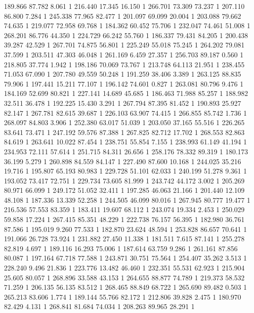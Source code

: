 	189.866	87.782	8.061	1
	216.440	17.345	16.150	1
	266.701	73.309	73.237	1
	207.110	86.800	7.284	1
	245.338	77.965	82.477	1
	201.097	69.099	20.004	1
	203.088	79.662	74.635	1
	219.077	72.958	69.768	1
	184.362	60.452	75.706	1
	232.047	74.461	51.008	1
	268.201	86.776	44.350	1
	224.729	66.242	55.760	1
	186.337	79.431	84.205	1
	200.438	39.287	42.529	1
	267.701	74.875	56.801	1
	225.249	55.018	75.245	1
	264.202	79.081	37.599	1
	203.511	47.303	46.048	1
	261.169	6.459	27.357	1
	256.703	89.187	0.560	1
	218.805	37.774	1.942	1
	198.186	70.069	73.767	1
	213.748	64.113	21.951	1
	238.455	71.053	67.090	1
	207.780	49.559	50.248	1
	191.259	38.406	3.389	1
	263.125	88.835	79.906	1
	197.441	15.211	77.107	1
	196.142	74.601	0.827	1
	263.081	80.796	9.476	1
	184.169	52.699	80.821	1
	227.141	14.689	45.685	1
	186.463	71.988	85.257	1
	188.982	32.511	36.478	1
	192.225	15.430	3.291	1
	267.794	87.395	81.452	1
	190.893	25.927	82.147	1
	267.781	82.615	39.687	1
	226.103	63.907	74.415	1
	266.855	85.742	1.736	1
	268.097	84.803	3.906	1
	252.380	63.017	51.039	1
	203.050	37.165	55.516	1
	226.265	83.641	73.471	1
	247.192	59.576	87.388	1
	267.825	82.712	17.702	1
	268.553	82.863	84.619	1
	263.641	10.022	87.454	1
	238.751	55.854	7.155	1
	238.993	61.149	41.194	1
	234.953	72.111	57.614	1
	251.715	84.311	26.656	1
	258.176	78.332	89.319	1
	180.173	36.199	5.279	1
	260.898	84.559	84.147	1
	227.490	87.600	10.168	1
	244.025	35.216	19.716	1
	195.807	65.193	80.983	1
	229.728	51.101	62.033	1
	240.199	51.278	9.361	1
	193.052	73.417	72.751	1
	229.734	73.605	81.999	1
	243.742	44.172	3.002	1
	205.269	80.971	66.099	1
	249.172	51.052	32.411	1
	197.285	46.063	21.166	1
	201.440	12.109	48.108	1
	187.336	13.339	52.258	1
	244.505	46.099	80.016	1
	267.945	80.777	19.477	1
	216.536	57.553	83.359	1
	183.411	19.607	68.112	1
	243.074	19.334	2.453	1
	250.029	59.858	17.224	1
	267.415	85.351	48.229	1
	222.738	76.157	56.395	1
	182.980	36.761	87.586	1
	195.019	9.260	77.533	1
	182.870	23.624	48.594	1
	253.828	86.657	70.641	1
	191.066	26.728	73.924	1
	231.882	27.450	11.338	1
	181.511	7.615	87.141	1
	255.278	82.819	4.697	1
	189.116	16.293	75.006	1
	187.614	63.759	9.286	1
	261.161	87.856	80.087	1
	197.164	67.718	77.588	1
	243.871	30.751	75.564	1
	254.407	35.262	3.513	1
	228.240	9.496	21.836	1
	223.776	13.482	46.460	1
	232.351	55.531	62.923	1
	215.904	25.605	80.057	1
	268.896	33.588	43.153	1
	264.655	88.877	74.789	1
	219.373	58.532	71.259	1
	206.135	56.135	83.512	1
	268.465	88.849	68.722	1
	265.690	89.482	0.503	1
	265.213	83.606	1.774	1
	189.144	55.766	82.172	1
	212.806	39.828	2.475	1
	180.970	82.429	4.131	1
	268.841	81.684	74.034	1
	208.263	89.965	28.291	1

